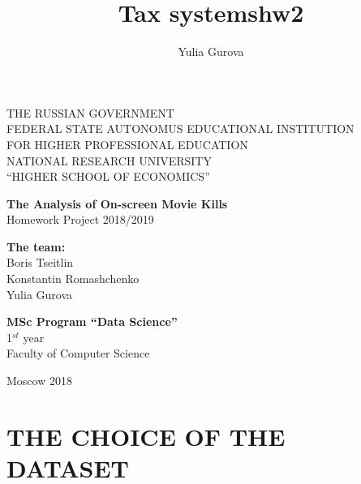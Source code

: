\documentclass[a4paper,14pt]{article}
\author{Yulia Gurova}
\title{Tax systems}
\title{hw2}
\begin{document}
	\thispagestyle{empty}    %
	
	\begin{center}
		
		
		THE RUSSIAN GOVERNMENT \\
		FEDERAL STATE AUTONOMUS EDUCATIONAL INSTITUTION \\ FOR HIGHER PROFESSIONAL EDUCATION \\ NATIONAL RESEARCH UNIVERSITY \\ ``HIGHER SCHOOL OF ECONOMICS''
		
		\large
		\vspace{2 cm}
	\end{center}
	
	\vspace{2 cm}
	\begin{center}
		\vspace{1 cm} \textbf{The Analysis of On-screen Movie Kills} \\ \vspace{0.5 cm} Homework Project 2018/2019 
		
		
	\end{center}
	
	\vspace{2 cm}
	
	\begin{flushright}
		{ \textbf{The team:} \\ Boris Tseitlin \\ Konstantin Romashchenko \\ Yulia Gurova}
		
		\vspace{1 cm}
		
		{ \textbf{MSc Program “Data Science” } \\ 1$^{st}$ year \\
			Faculty of Computer Science }
	\end{flushright}
	
	\begin{center}
		\vfill
		Moscow 2018	
	\end{center}
	
	\newpage
	\tableofcontents
	\newpage
	
	
	\section{THE CHOICE OF THE DATASET}
    
\end{document}
